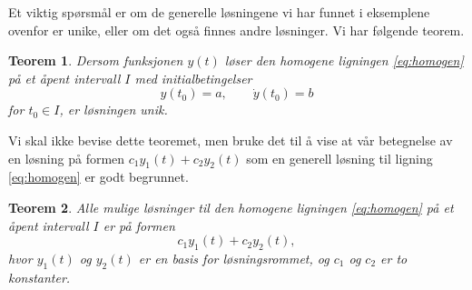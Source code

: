 \documentclass{article}
\newtheorem{thm}{Teorem}\surroundwithmdframed{thm}
\theoremstyle{definition}
\theoremstyle{remark}
\begin{document}
\begin{multicols*}{2}
Et viktig spørsmål er om de generelle løsningene vi har funnet i eksemplene ovenfor er unike, eller om det også finnes andre løsninger. Vi har følgende teorem.

\begin{thm}
  Dersom funksjonen $y(t)$ løser den homogene ligningen \eqref{eq:homogen} på et åpent intervall $I$ med initialbetingelser
  \begin{equation*}
    y(t_0) = a, \qquad \dot{y}(t_0) = b
  \end{equation*}
  for $t_0 \in I$, er løsningen unik.
\end{thm}

Vi skal ikke bevise dette teoremet, men bruke det til å vise at vår betegnelse av en løsning på formen $c_1 y_1(t) + c_2 y_2(t)$ som en generell løsning til ligning \eqref{eq:homogen} er godt begrunnet.

\begin{thm} \label{thm:unik}
  Alle mulige løsninger til den homogene ligningen \eqref{eq:homogen} på et åpent intervall $I$ er på formen
  \begin{equation*}
    c_1 y_1(t) + c_2 y_2(t),
  \end{equation*}
  hvor $y_1(t)$ og $y_2(t)$ er en basis for løsningsrommet, og $c_1$ og $c_2$ er to konstanter.
\end{thm}


\end{multicols*}
\end{document}
